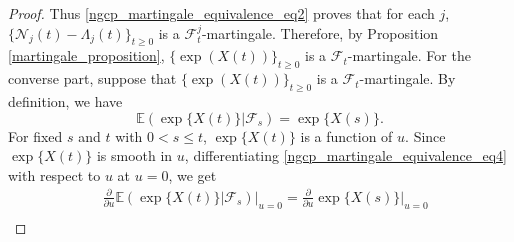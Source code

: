 \documentclass[11pt,oneside,reqno]{amsart}
\theoremstyle{definition}
\theoremstyle{remarkstyle}
\begin{document}
\begin{proof}
    Thus \eqref{ngcp_martingale_equivalence_eq2} proves that for each $j$, $\{\mathcal{N}_j(t)-\Lambda_j(t)\}_{t\ge 0}$ is a $\mathcal{F}_t^j$-martingale.
    Therefore, by Proposition \ref{martingale_proposition}, $\{\exp\left(X(t)\right)\}_{t\ge 0}$ is a $\mathcal{F}_t$-martingale. For the converse part, suppose that $\{\exp\left(X(t)\right)\}_{t\ge 0}$ is a $\mathcal{F}_t$-martingale. By definition, we have
    \begin{equation}
        \mathbb{E}\left(\exp\{X(t)\}\big|\mathcal{F}_s\right)=\exp\{X(s)\}.\label{ngcp_martingale_equivalence_eq4}
    \end{equation}
    For fixed $s$ and $t$ with $0<s\le t$, $\exp\{X(t)\}$ is a function of $u$. Since $\exp\{X(t)\}$ is smooth in $u$, differentiating \eqref{ngcp_martingale_equivalence_eq4} with respect to $u$ at $u=0$, we get
    \begin{align}
       &\frac{\partial}{\partial u}\mathbb{E}\left(\exp\{X(t)\}\big|\mathcal{F}_s\right)\bigg|_{u=0}=\frac{\partial}{\partial u}\exp\{X(s)\}\bigg|_{u=0}\nonumber\\ 

\end{align}
\end{proof}
\end{document}
